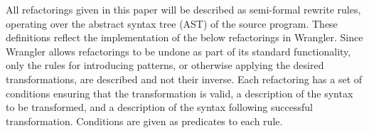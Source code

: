 \documentclass[final]{jfp1}
\begin{document}


 

%

All refactorings given in this paper will be described as semi-formal rewrite
rules, operating over the abstract syntax tree (AST) of the source program.
% 
These definitions reflect the implementation of the below refactorings in Wrangler. Since Wrangler allows refactorings to be undone as part of its standard functionality, only the rules for introducing patterns, or otherwise applying the desired transformations, are described and not their inverse.
% 
Each refactoring has a set of conditions ensuring that the transformation is valid, a
description of the syntax to be transformed, and a description of the syntax
following successful transformation. Conditions are given as predicates to each
rule.
\end{document}
